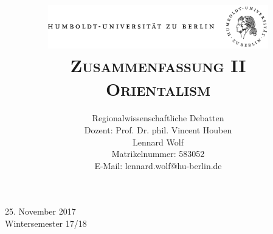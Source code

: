 \documentclass[a4paper, 12pt]{article}
\date{\vspace{-3ex}}
\begin{document}
\title{\vspace{5ex}
	\includegraphics*[bb=0 0 720 200, width=0.72\textwidth]{ErstesSem/images/hu_logo.png}\\
	\vspace{30pt}
	\scshape\LARGE{Zusammenfassung II}\\\Large{Orientalism}\vspace{20pt}}
	


\author{Regionalwissenschaftliche Debatten\\
	\vspace{7pt}
          Dozent: Prof. Dr. phil. Vincent Houben\\\vspace{4pt}Lennard Wolf\\
        \small{Matrikelnummer: 583052}\\
        \small{E-Mail: lennard.wolf@hu-berlin.de}}


\maketitle

\vspace{\fill}

\begin{minipage}[]{0.92\textwidth}
    \centering
    \onehalfspacing
    \large   
    25. November 2017\\
    Wintersemester 17/18

    \vspace{-20mm} 
\end{minipage}%
\thispagestyle{empty}
\newpage
\setcounter{page}{1}
\end{document}
